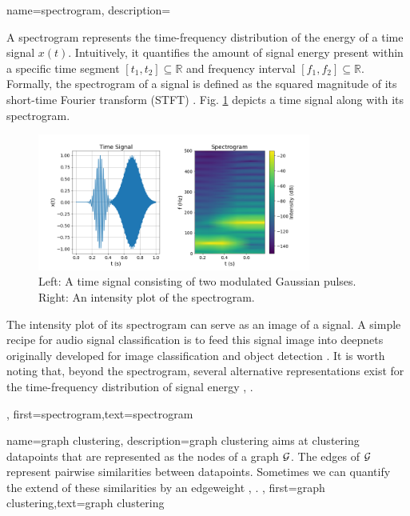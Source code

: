 {name={spectrogram},
	description={
		A spectrogram represents the time-frequency distribution of the energy of a time signal $x(t)$.  
		Intuitively, it quantifies the amount of signal energy present within a specific time segment 
		$[t_{1},t_{2}] \subseteq \mathbb{R}$ and frequency interval $[f_{1},f_{2}]\subseteq \mathbb{R}$. 
		Formally, the spectrogram of a signal is defined as the squared magnitude of its 
		short-time Fourier transform (STFT) \cite{cohen1995time}.
        Fig. \ref{fig:spectrogram_dict} depicts a time signal along with its spectrogram. 
	\begin{figure}[H]
		\centering
		\includegraphics[width=0.8\textwidth]{assets/spectrogram.png}
		\caption{Left: A time signal consisting of two modulated Gaussian pulses. Right: An intensity 
		plot of the spectrogram.
		\label{fig:spectrogram_dict}}
	\end{figure}
        The intensity plot of its spectrogram can serve as an image of a signal. A 
		simple recipe for audio signal \gls{classification} is to feed this signal image 
		into \gls{deepnet}s originally developed for image \gls{classification} and object detection \cite{Li:2022aa}. 
		It is worth noting that, beyond the spectrogram, several alternative representations exist 
		for the time-frequency distribution of signal energy \cite{TimeFrequencyAnalysisBoashash}, \cite{MallatBook}. 
		}, 
	first={spectrogram},text={spectrogram} 
}

{name={graph clustering},
	description={\Gls{graph} \gls{clustering} aims at 
		\gls{clustering} \gls{datapoint}s that are represented as the nodes 
		of a \gls{graph} $\mathcal{G}$. The edges of $\mathcal{G}$ represent 
		pairwise similarities between \gls{datapoint}s. Sometimes we
		can quantify the extend of these similarities by an \gls{edgeweight} \cite{FlowSpecClustering2021}, \cite{Luxburg2007}. }, 
	first={graph clustering},text={graph clustering} 
}

